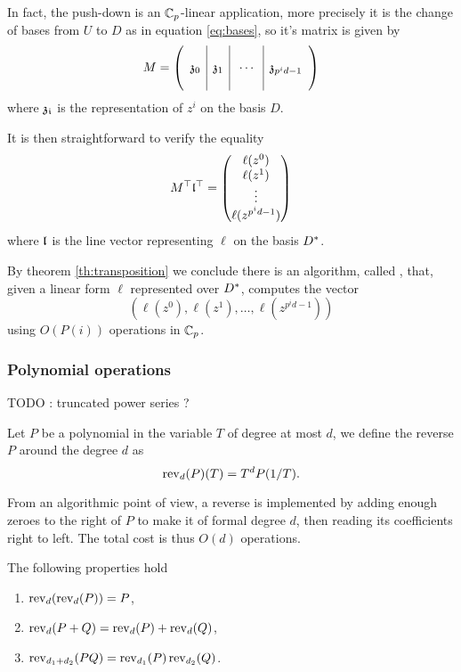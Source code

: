 In fact, the push-down is an $\mathbb{C}_p$-linear application, more precisely
it is the change of bases from $U$ to $D$ as in equation
\eqref{eq:bases}, so it's matrix is given by
\begin{equation*}
  M = \left(\begin{array}{c|c|c|c}
    &&&\\
    \mathfrak{z}_0 & \mathfrak{z}_1 &
    \;\cdots\; & \mathfrak{z}_{p^id-1} \\
    &&&
  \end{array}\right)
\end{equation*}
where $\mathfrak{z_i}$ is the representation of $z^i$ on the basis $D$.

It is then straightforward to verify the equality 
\begin{equation*}
  M^\top\mathfrak{l}^\top = 
  \begin{pmatrix}
    \ell(z^0)\\ \ell(z^1)\\ \vdots\\ \ell(z^{p^id-1})
  \end{pmatrix}
\end{equation*}
where $\mathfrak{l}$ is the line vector representing $\ell$ on the basis
$D^\ast$.

By theorem \ref{th:transposition} we conclude there is an algorithm,
called , that, given a linear form $\ell$
represented over $D^\ast$, computes the vector
\[\left(\ell(z^0), \ell(z^1), \ldots, \ell(z^{p^id-1})\right)\]
using $O(P(i))$ operations in $\mathbb{C}_p$.

\subsubsection{Polynomial operations}

TODO : truncated power series ?

\begin{definition}[Reverse]
  \label{def:rev}
  Let $P$ be a polynomial in the variable $T$ of degree at most $d$,
  we define the reverse $P$ around the degree $d$ as
  \[\operatorname{rev}_d(P)(T) = T^dP(1/T) \text{.}\]
\end{definition}
From an algorithmic point of view, a reverse is implemented by adding
enough zeroes to the right of $P$ to make it of formal degree $d$,
then reading its coefficients right to left. The total cost is thus
$O(d)$ operations.

\begin{proposition}
  The following properties hold
  \begin{enumerate}
  \item $\operatorname{rev}_d(\operatorname{rev}_d(P)) = P$,
  \item $\operatorname{rev}_d(P+Q) = \operatorname{rev}_d(P) + \operatorname{rev}_d(Q)$,
  \item $\operatorname{rev}_{d_1+d_2}(PQ) = \operatorname{rev}_{d_1}(P)\operatorname{rev}_{d_2}(Q)$.
  \end{enumerate}
\end{proposition}


